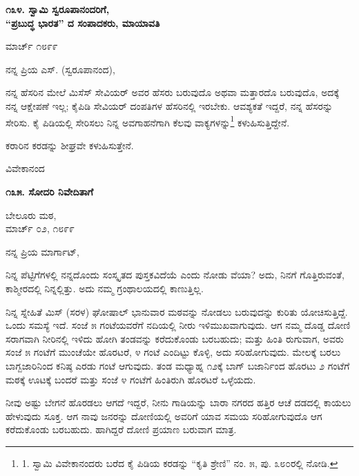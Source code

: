 \begin{center}
\textbf{೧೩೪. ಸ್ವಾಮಿ ಸ್ವರೂಪಾನಂದರಿಗೆ,\\“ಪ್ರಬುದ್ಧ ಭಾರತ” ದ ಸಂಪಾದಕರು, ಮಾಯಾವತಿ}
\end{center}

\begin{flushright}
ಮಾರ್ಚ್ ೧೮೯೯
\end{flushright}

ನನ್ನ ಪ್ರಿಯ ಎಸ್. (ಸ್ವರೂಪಾನಂದ),

ನನ್ನ ಹೆಸರಿನ ಮೇಲೆ ಮಿಸೆಸ್ ಸೇವಿಯರ್ ಅವರ ಹೆಸರು ಬರುವುದೊ ಅಥವಾ ಮತ್ತಾರದೊ ಬರುವುದೊ, ಅದಕ್ಕೆ ನನ್ನ ಆಕ್ಷೇಪಣೆ ಇಲ್ಲ; ಕೈಪಿಡಿ ಸೇವಿಯರ್ ದಂಪತಿಗಳ ಹೆಸರಿನಲ್ಲಿ ಇರಬೇಕು. ಆವಶ್ಯಕತೆ ಇದ್ದರೆ, ನನ್ನ ಹೆಸರನ್ನು ಸೇರಿಸು. ಕೈ ಪಿಡಿಯಲ್ಲಿ ಸೇರಿಸಲು ನಿನ್ನ ಅವಗಾಹನೆಗಾಗಿ ಕೆಲವು ವಾಕ್ಯಗಳನ್ನು\footnote{1. ಸ್ವಾಮಿ ವಿವೇಕಾನಂದರು ಬರೆದ ಕೈ ಪಿಡಿಯ ಕರಡನ್ನು “ಕೃತಿ ಶ್ರೇಣಿ” ನಂ. ೫, ಪು. ೩೮೦ರಲ್ಲಿ ನೋಡಿ.} ಕಳುಹಿಸುತ್ತಿದ್ದೇನೆ.

ಕರಾರಿನ ಕರಡನ್ನು ಶೀಘ್ರವೇ ಕಳುಹಿಸುತ್ತೇನೆ.

\begin{flushright}
ವಿವೇಕಾನಂದ
\end{flushright}

\begin{center}
\textbf{೧೩೫. ಸೋದರಿ ನಿವೇದಿತಾಗೆ}
\end{center}

\begin{flushright}
ಬೇಲೂರು ಮಠ,\\ಮಾರ್ಚ್ ೦೨, ೧೮೯೯
\end{flushright}

ನನ್ನ ಪ್ರಿಯ ಮಾರ್ಗಾಟ್,

ನಿನ್ನ ಪೆಟ್ಟಿಗೆಗಳಲ್ಲಿ ನನ್ನದೊಂದು ಸಂಸ್ಕೃತದ ಪುಸ್ತಕವಿದೆಯೆ ಎಂದು ನೋಡು ವೆಯಾ? ಅದು, ನಿನಗೆ ಗೊತ್ತಿರುವಂತೆ, ಕಾಶ್ಮೀರದಲ್ಲಿ ನಿನ್ನಲ್ಲಿತ್ತು. ಅದು ನಮ್ಮ ಗ್ರಂಥಾಲಯದಲ್ಲಿ ಕಾಣುತ್ತಿಲ್ಲ.

ನಿನ್ನ ಸ್ನೇಹಿತೆ ಮಿಸ್ (ಸರಳ) ಘೋಷಾಲ್ ಭಾನುವಾರ ಮಠವನ್ನು ನೋಡಲು ಬರುವುದನ್ನು ಕುರಿತು ಯೋಚಿಸುತ್ತಿದ್ದೆ. ಒಂದು ಸಮಸ್ಯೆ ಇದೆ. ಸಂಜೆ ೫ ಗಂಟೆಯವರೆಗೆ ನದಿಯಲ್ಲಿ ನೀರು ಇಳಿಮುಖವಾಗುವುದು. ಆಗ ನಮ್ಮ ದೊಡ್ಡ ದೋಣಿ ಸರಾಗವಾಗಿ ನೀರಿನಲ್ಲಿ ಇಳಿದು ಹೋಗಿ ತಂಡವನ್ನು ಕರೆದುಕೊಂಡು ಬರಬಹುದು; ಮತ್ತು ಹಿಂತಿ ರುಗುವಾಗ, ಅವರು ಸಂಜೆ ೫ ಗಂಟೆಗೆ ಮುಂಚೆಯೇ ಹೊರಟರೆ, ೪ ಗಂಟೆ ಎಂದಿಟ್ಟು ಕೊಳ್ಳಿ, ಅದು ಸರಿಹೋಗುವುದು. ಮೇಲಕ್ಕೆ ಬರಲು ಬಾಗ್ಬಜಾರಿನಿಂದ ಕನಿಷ್ಠ ಎರಡು ಗಂಟೆ ಆಗುವುದು. ತಂಡ ಮಧ್ಯಾಹ್ನ ೧೨ಕ್ಕೆ ಬಾಗ್ ಬಜಾರ್ನಿಂದ ಹೊರಟು ೨ ಗಂಟೆಗೆ ಮಠಕ್ಕೆ ಊಟಕ್ಕೆ ಬಂದರೆ ಮತ್ತು ಸಂಜೆ ೪ ಗಂಟೆಗೆ ಹಿಂತಿರುಗಿ ಹೊರಟರೆ ಒಳ್ಳೆಯದು.

ನೀವು ಅಷ್ಟು ಬೇಗನೆ ಹೊರಡಲು ಆಗದೆ ಇದ್ದರೆ, ನೀನು ಗಾಡಿಯನ್ನು ಬಾರಾ ನಗರದ ಹತ್ತಿರ ಆಚೆ ದಡದಲ್ಲಿ ಕಾಯಲು ಹೇಳುವುದು ಸೂಕ್ತ. ಆಗ ನಾವು ಜನರನ್ನು ದೋಣಿಯಲ್ಲಿ ಅವರಿಗೆ ಯಾವ ಸಮಯ ಸರಿಹೋಗುವುದೊ ಆಗ ಕರೆದುಕೊಂಡು ಬರಬಹುದು. ಹಾಗಿದ್ದರೆ ದೋಣಿ ಪ್ರಯಾಣ ಬರುವಾಗ ಮಾತ್ರ.

